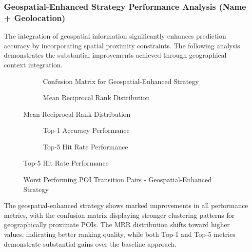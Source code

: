 \documentclass[12pt,a4paper]{article}
\begin{document}
\subsubsection{Geospatial-Enhanced Strategy Performance Analysis (Name + Geolocation)}

The integration of geospatial information significantly enhances prediction accuracy by incorporating spatial proximity constraints. The following analysis demonstrates the substantial improvements achieved through geographical context integration.

\begin{figure}[h]
\centering
\begin{subfigure}{0.48\textwidth}
\centering
\caption{Confusion Matrix for Geospatial-Enhanced Strategy}
\label{fig:geospatial_confusion}
\end{subfigure}
\hfill
\begin{subfigure}{0.48\textwidth}
\centering
\caption{Mean Reciprocal Rank Distribution}
\label{fig:geospatial_mrr}
\end{subfigure}
\end{figure}

\begin{figure}[h]
\centering
\begin{subfigure}{0.48\textwidth}
\centering
\caption{Top-1 Accuracy Performance}
\label{fig:geospatial_top1}
\end{subfigure}
\hfill
\begin{subfigure}{0.48\textwidth}
\centering
\caption{Top-5 Hit Rate Performance}
\label{fig:geospatial_top5}
\end{subfigure}
\end{figure}

\begin{figure}[h]
\centering
\caption{Worst Performing POI Transition Pairs - Geospatial-Enhanced Strategy}
\label{fig:geospatial_worst_pairs}
\end{figure}

The geospatial-enhanced strategy shows marked improvements in all performance metrics, with the confusion matrix displaying stronger clustering patterns for geographically proximate POIs. The MRR distribution shifts toward higher values, indicating better ranking quality, while both Top-1 and Top-5 metrics demonstrate substantial gains over the baseline approach.
\end{document}
